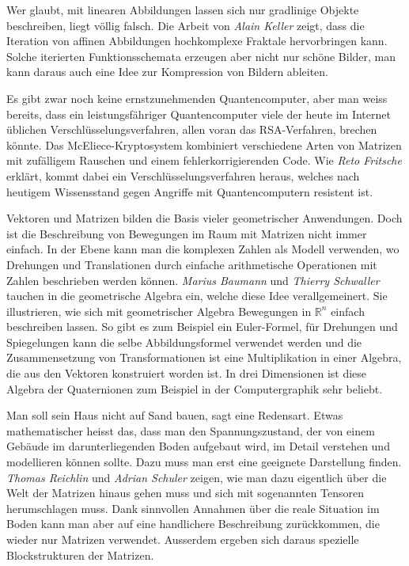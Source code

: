 Wer glaubt, mit linearen Abbildungen lassen sich nur gradlinige
Objekte beschreiben, liegt völlig falsch.
Die Arbeit von {\em Alain Keller} zeigt, dass die Iteration von
affinen Abbildungen hochkomplexe Fraktale hervorbringen kann.
Solche iterierten Funktionsschemata erzeugen aber nicht nur schöne
Bilder, man kann daraus auch eine Idee zur Kompression von
Bildern ableiten.

Es gibt zwar noch keine ernstzunehmenden Quantencomputer, aber man weiss
bereits, dass ein leistungsfähriger Quantencomputer viele der heute
im Internet üblichen Verschlüsselungsverfahren, allen voran das RSA-Verfahren,
brechen könnte.
Das McEliece-Kryptosystem kombiniert verschiedene Arten von Matrizen
mit zufälligem Rauschen und einem fehlerkorrigierenden Code.
Wie {\em Reto Fritsche} erklärt, kommt dabei ein Verschlüsselungsverfahren
heraus, welches nach heutigem Wissensstand gegen Angriffe mit
Quantencomputern resistent ist.

Vektoren und Matrizen bilden die Basis vieler geometrischer
Anwendungen.
Doch ist die Beschreibung von Bewegungen im Raum mit Matrizen nicht
immer einfach.
In der Ebene kann man die komplexen Zahlen als Modell verwenden,
wo Drehungen und Translationen durch einfache arithmetische
Operationen mit Zahlen beschrieben werden können.
{\em Marius Baumann} und {\em Thierry Schwaller} tauchen in die
geometrische Algebra ein, welche diese Idee verallgemeinert.
Sie illustrieren, wie sich mit geometrischer Algebra Bewegungen
in $\mathbb{R}^n$ einfach beschreiben lassen.
So gibt es zum Beispiel ein Euler-Formel, für Drehungen und Spiegelungen
kann die selbe Abbildungsformel verwendet werden und die Zusammensetzung
von Transformationen ist eine Multiplikation in einer Algebra, die
aus den Vektoren konstruiert worden ist.
In drei Dimensionen ist diese Algebra der Quaternionen zum Beispiel
in der Computergraphik sehr beliebt.

Man soll sein Haus nicht auf Sand bauen, sagt eine Redensart.
Etwas mathematischer heisst das, dass man den Spannungszustand,
der von einem Gebäude im darunterliegenden Boden aufgebaut wird,
im Detail verstehen und modellieren können sollte.
Dazu muss man erst eine geeignete Darstellung finden.
{\em Thomas Reichlin} und {\em Adrian Schuler} zeigen, wie man 
dazu eigentlich über die Welt der Matrizen hinaus gehen muss und
sich mit sogenannten Tensoren herumschlagen muss.
Dank sinnvollen Annahmen über die reale Situation im Boden
kann man aber auf eine handlichere Beschreibung zurückkommen,
die wieder nur Matrizen verwendet.
Ausserdem ergeben sich daraus spezielle Blockstrukturen der
Matrizen.

